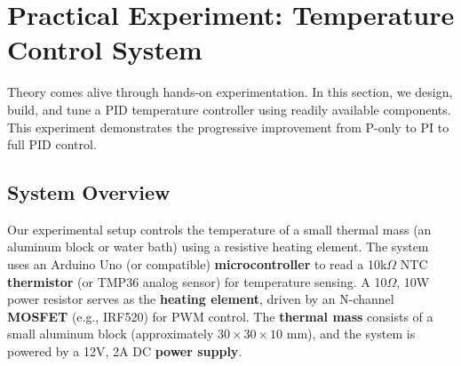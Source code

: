 \section{Practical Experiment: Temperature Control System}

Theory comes alive through hands-on experimentation. In this section, we design, build, and tune a PID temperature controller using readily available components. This experiment demonstrates the progressive improvement from P-only to PI to full PID control.

\subsection{System Overview}

Our experimental setup controls the temperature of a small thermal mass (an aluminum block or water bath) using a resistive heating element. The system uses an Arduino Uno (or compatible) \textbf{microcontroller} to read a 10k$\Omega$ NTC \textbf{thermistor} (or TMP36 analog sensor) for temperature sensing. A 10$\Omega$, 10W power resistor serves as the \textbf{heating element}, driven by an N-channel \textbf{MOSFET} (e.g., IRF520) for PWM control. The \textbf{thermal mass} consists of a small aluminum block (approximately $30 \times 30 \times 10$ mm), and the system is powered by a 12V, 2A DC \textbf{power supply}.

